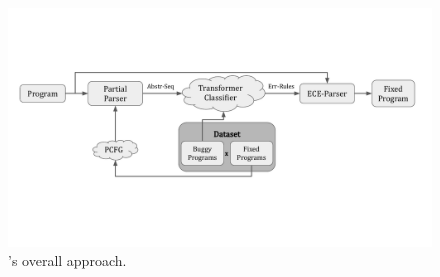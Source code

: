 


\begin{figure}[t]
  \centering
  \includegraphics[trim={0 3.8cm 0 3.8cm}, clip, width=0.9\linewidth]{overall-approach.pdf}
  \caption{\toolname's overall approach.}
  \label{fig:overall-approach}
\end{figure}



